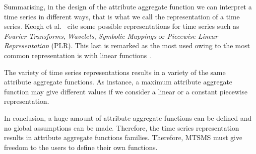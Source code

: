 
Summarising, in the design of the attribute aggregate function we can
interpret a time series in different ways, that is what we call the
representation of a time series. Keogh et al.\ \cite{last:keogh} cite
some possible representations for time series such as \emph{Fourier
  Transforms}, \emph{Wavelets}, \emph{Symbolic Mappings} or
\emph{Piecewise Linear Representation} (PLR). This last is remarked as
the most used owing to the most common representation is with linear
functions \cite{keogh01}.

The variety of time series representations results in a variety of the
same attribute aggregate functions. As instance, a maximum attribute
aggregate function may give different values if we consider a linear
or a constant piecewise representation. 

In conclusion, a huge amount of attribute aggregate functions can be
defined and no global assumptions can be made.  Therefore, the time
series representation results in attribute aggregate functions
families.  Therefore, MTSMS must give freedom to the users to define
their own functions.








